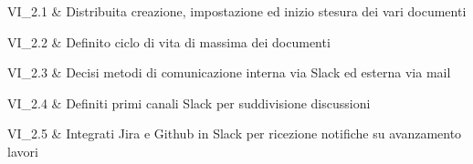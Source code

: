 VI\_2.1 & Distribuita creazione, impostazione ed inizio stesura dei vari documenti

\tabularnewline
VI\_2.2 & Definito ciclo di vita di massima dei documenti

\tabularnewline
VI\_2.3 & Decisi metodi di comunicazione interna via Slack ed esterna via mail

\tabularnewline
VI\_2.4 & Definiti primi canali Slack per suddivisione discussioni

\tabularnewline
VI\_2.5 & Integrati Jira e Github in Slack per ricezione notifiche su avanzamento lavori